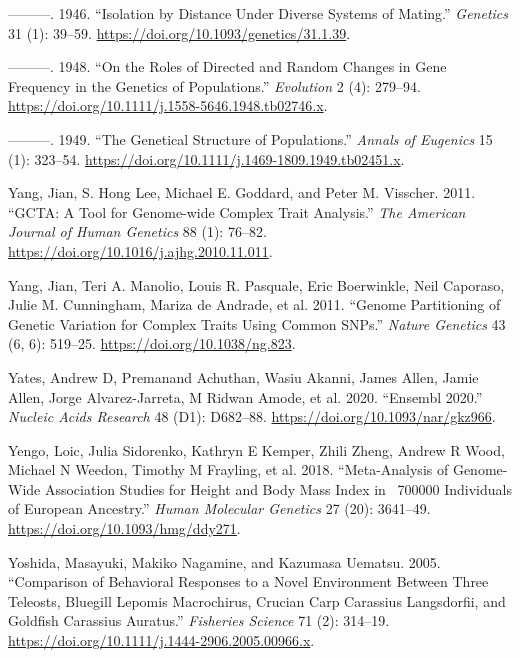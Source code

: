 \documentclass[
]{book}
\newlength{\cslhangindent}
\newlength{\cslentryspacingunit} %
\newenvironment{CSLReferences}[2] %
 {%
  \setlength{\parindent}{0pt}
  \ifodd #1
  \let\oldpar\par
  \def\par{\hangindent=\cslhangindent\oldpar}
  \fi
  \setlength{\parskip}{#2\cslentryspacingunit}
 }%
 {}
\begin{document}
\begin{CSLReferences}{1}{0}
\leavevmode{}%
---------. 1946. {``Isolation by {Distance} Under {Diverse Systems} of {Mating}.''} \emph{Genetics} 31 (1): 39--59. \url{https://doi.org/10.1093/genetics/31.1.39}.

\leavevmode{}%
---------. 1948. {``On the {Roles} of {Directed} and {Random Changes} in {Gene Frequency} in the {Genetics} of {Populations}.''} \emph{Evolution} 2 (4): 279--94. \url{https://doi.org/10.1111/j.1558-5646.1948.tb02746.x}.

\leavevmode{}%
---------. 1949. {``The {Genetical Structure} of {Populations}.''} \emph{Annals of Eugenics} 15 (1): 323--54. \url{https://doi.org/10.1111/j.1469-1809.1949.tb02451.x}.

\leavevmode{}%
Yang, Jian, S. Hong Lee, Michael E. Goddard, and Peter M. Visscher. 2011. {``{GCTA}: {A Tool} for {Genome-wide Complex Trait Analysis}.''} \emph{The American Journal of Human Genetics} 88 (1): 76--82. \url{https://doi.org/10.1016/j.ajhg.2010.11.011}.

\leavevmode{}%
Yang, Jian, Teri A. Manolio, Louis R. Pasquale, Eric Boerwinkle, Neil Caporaso, Julie M. Cunningham, Mariza de Andrade, et al. 2011. {``Genome Partitioning of Genetic Variation for Complex Traits Using Common {SNPs}.''} \emph{Nature Genetics} 43 (6, 6): 519--25. \url{https://doi.org/10.1038/ng.823}.

\leavevmode{}%
Yates, Andrew D, Premanand Achuthan, Wasiu Akanni, James Allen, Jamie Allen, Jorge Alvarez-Jarreta, M Ridwan Amode, et al. 2020. {``Ensembl 2020.''} \emph{Nucleic Acids Research} 48 (D1): D682--88. \url{https://doi.org/10.1093/nar/gkz966}.

\leavevmode{}%
Yengo, Loic, Julia Sidorenko, Kathryn E Kemper, Zhili Zheng, Andrew R Wood, Michael N Weedon, Timothy M Frayling, et al. 2018. {``Meta-Analysis of Genome-Wide Association Studies for Height and Body Mass Index in ~700000 Individuals of {European} Ancestry.''} \emph{Human Molecular Genetics} 27 (20): 3641--49. \url{https://doi.org/10.1093/hmg/ddy271}.

\leavevmode{}%
Yoshida, Masayuki, Makiko Nagamine, and Kazumasa Uematsu. 2005. {``Comparison of Behavioral Responses to a Novel Environment Between Three Teleosts, Bluegill {Lepomis} Macrochirus, Crucian Carp {Carassius} Langsdorfii, and Goldfish {Carassius} Auratus.''} \emph{Fisheries Science} 71 (2): 314--19. \url{https://doi.org/10.1111/j.1444-2906.2005.00966.x}.


\end{CSLReferences}
\end{document}

